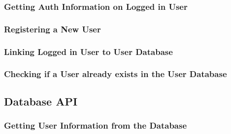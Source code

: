 \subsubsection{Getting Auth Information on Logged in User}


\subsubsection{Registering a New User}


\subsubsection{Linking Logged in User to User Database}


\subsubsection{Checking if a User already exists in the User Database}


\subsection{Database API}

\subsubsection{Getting User Information from the Database}
